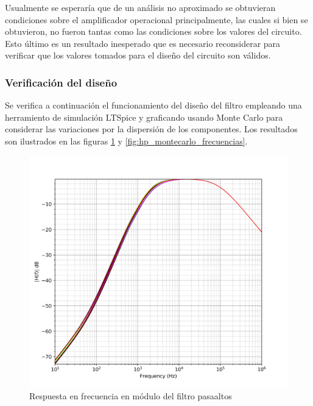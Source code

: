 Usualmente se esperar\'ia que de un an\'alisis no aproximado se obtuvieran condiciones sobre el amplificador operacional principalmente, las cuales si bien se obtuvieron, no fueron tantas como las condiciones
sobre los valores del circuito. Esto \'ultimo es un resultado inesperado que es necesario reconsiderar para verificar que los valores tomados para el dise\~no del circuito son v\'alidos.

\subsubsection{Verificaci\'on del dise\~no}
Se verifica a continuaci\'on el funcionamiento del dise\~no del filtro empleando una herramiento de simulaci\'on LTSpice y graficando usando Monte Carlo para considerar las variaciones
por la dispersi\'on de los componentes. Los resultados son ilustrados en las figuras \ref{fig:hp_montecarlo} y \ref{fig:hp_montecarlo_frecuencias}.

\begin{figure}[H]
    \centering
        \includegraphics[scale=0.12]{../EJ2/Recursos/hp_montecarlo.png}
    \caption{Respuesta en frecuencia en m\'odulo del filtro pasaaltos}
    \label{fig:hp_montecarlo}
\end{figure}


